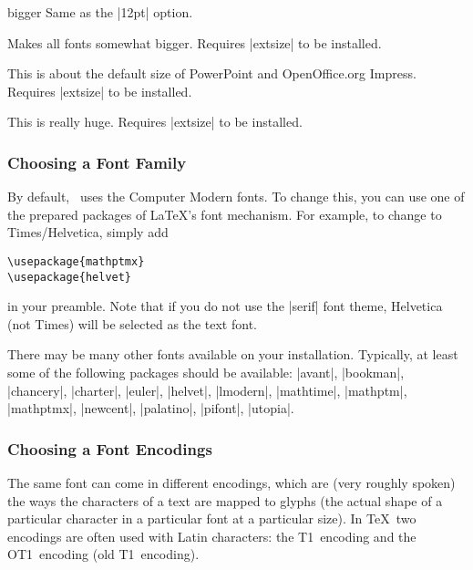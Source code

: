 \begin{classoption}{bigger}
  Same as the |12pt| option.
\end{classoption}

\begin{classoption}{14pt}
  Makes all fonts somewhat bigger. Requires |extsize| to be installed.
\end{classoption}

\begin{classoption}{17pt}
  This is about the default size of PowerPoint and OpenOffice.org Impress. Requires |extsize| to be installed.
\end{classoption}

\begin{classoption}{20pt}
  This is really huge. Requires |extsize| to be installed.
\end{classoption}

\subsubsection{Choosing a Font Family}

\label{section-substition}

By default, \beamer\ uses the Computer Modern fonts. To change this, you can use one of the prepared packages of \LaTeX's font mechanism. For example, to change to Times/Helvetica, simply add
\begin{verbatim}
\usepackage{mathptmx}
\usepackage{helvet}
\end{verbatim}
in your preamble. Note that if you do not use the |serif| font theme, Helvetica (not Times) will be selected as the text font.

There may be many other fonts available on your installation. Typically, at least some of the following packages should be available: |avant|, |bookman|, |chancery|, |charter|, |euler|, |helvet|, |lmodern|, |mathtime|, |mathptm|, |mathptmx|, |newcent|, |palatino|, |pifont|, |utopia|.

\subsubsection{Choosing a Font Encodings}
\label{section-font-encoding}

The same font can come in different encodings, which are (very roughly spoken) the ways the characters of a text are mapped to glyphs (the actual shape of a particular character in a particular font at a particular size). In \TeX\ two encodings are often used with Latin characters: the T1~encoding and the OT1~encoding (old T1~encoding).

